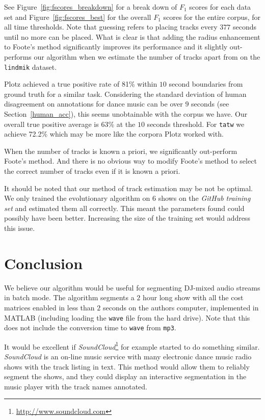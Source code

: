 \documentclass[twocolumn]{article}
\begin{document}
See Figure~\ref{fig:fscores_breakdown} for a break down of $F_1$ scores for each data set and Figure~\ref{fig:fscores_best} for the overall $F_1$ scores for the entire corpus, for all time thresholds. Note that guessing refers to placing tracks every $377$ seconds until no more can be placed. What is clear is that adding the radius enhancement to Foote's method significantly improves its performance and it slightly out-performs our algorithm when we estimate the number of tracks apart from on the \texttt{lindmik} dataset. 

Plotz \citep{plotz2006automatic} achieved a true positive rate of 81\% within $10$ second boundaries from ground truth for a similar task. Considering the standard deviation of human disagreement on annotations for dance music can be over $9$ seconds (see Section~\ref{human_acc}), this seems unobtainable with the corpus we have. Our overall true positive average is 63\% at the $10$ seconds threshold. For \texttt{tatw} we achieve 72.2\% which may be more like the corpora Plotz worked with.

When the number of tracks is known a priori, we significantly out-perform Foote's method. And there is no obvious way to modify Foote's method to select the correct number of tracks even if it is known a priori. 

It should be noted that our method of track estimation may be not be optimal. We only trained the evolutionary algorithm on $6$ shows on the \textit{GitHub training set} and estimated them all correctly. This meant the parameters found could possibly have been better. Increasing the size of the training set would address this issue. 

\section{Conclusion}\label{conclusions}

We believe our algorithm would be useful for segmenting DJ-mixed audio streams in batch mode. The algorithm segments a $2$ hour long show with all the cost matrices enabled in less than $2$ seconds on the authors computer, implemented in MATLAB (including loading the \texttt{wave} file from the hard drive). Note that this does not include the conversion time to \texttt{wave} from \texttt{mp3}.

It would be excellent if \textit{SoundCloud}\footnote{\url{http://www.soundcloud.com}} for example started to do something similar. \textit{SoundCloud} is an on-line music service with many electronic dance music radio shows with the track listing in text. This method would allow them to reliably segment the shows, and they could display an interactive segmentation in the music player with the track names annotated. 
\end{document}
